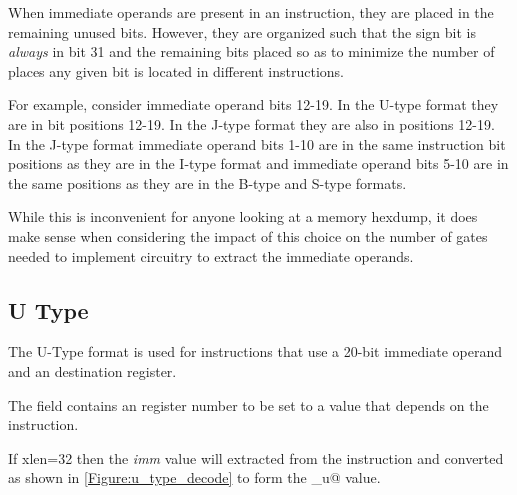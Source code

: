 When immediate operands are present in an instruction, they are placed in
the remaining unused bits.  However, they are organized such that
the sign bit is {\em always} in bit 31 and the remaining bits placed so
as to minimize the number of places any given bit is located in different
instructions. 

For example, consider immediate operand bits 12-19.  In the U-type format
they are in bit positions 12-19.  In the J-type format they are also in positions
12-19.  In the J-type format immediate operand bits 1-10 are in the same 
instruction bit positions as they are in the I-type format and immediate
operand bits 5-10 are in the same positions as they are in the B-type and
S-type formats.

While this is inconvenient for anyone looking at a memory hexdump, it does
make sense when considering the impact of this choice on the number of
gates needed to implement circuitry to extract the immediate operands. 


\subsection{U Type}
\label{insnformat:utype}

The U-Type format is used for instructions that use a 20-bit immediate operand 
and an \verb@rd@ destination register.
 

The  field contains an  register number to be set to a value that
depends on the instruction.


If \Gls{xlen}=32 then the {\em imm} value will extracted from the instruction
and converted as shown in \autoref{Figure:u_type_decode} to form the
\verb@imm_u@ value.

\begin{figure}[ht]
\centering
\DrawInsnOpUTypeDecoding
{}
\label{Figure:u_type_decode}
\label{imm.u:decode}
\end{figure}

